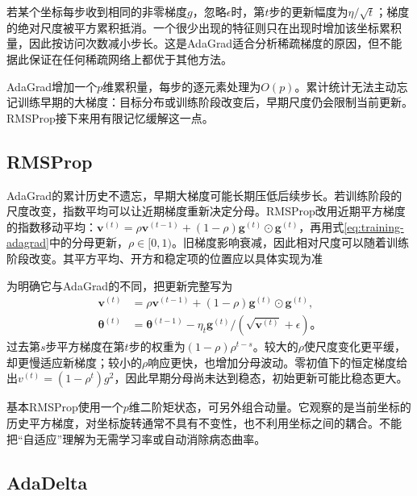 若某个坐标每步收到相同的非零梯度$g$，忽略$\epsilon$时，第$t$步的更新幅度为$\eta/\sqrt t$；梯度的绝对尺度被平方累积抵消。一个很少出现的特征则只在出现时增加该坐标累积量，因此按访问次数减小步长。这是AdaGrad适合分析稀疏梯度的原因，但不能据此保证在任何稀疏网络上都优于其他方法。

AdaGrad增加一个$p$维累积量，每步的逐元素处理为$O(p)$。累计统计无法主动忘记训练早期的大梯度：目标分布或训练阶段改变后，早期尺度仍会限制当前更新。RMSProp接下来用有限记忆缓解这一点。

\subsection{RMSProp}
\label{sec:training-rmsprop}

AdaGrad的累计历史不遗忘，早期大梯度可能长期压低后续步长。若训练阶段的尺度改变，指数平均可以让近期梯度重新决定分母。RMSProp改用近期平方梯度的指数移动平均：$\bm v^{(t)}=\rho\bm v^{(t-1)}+(1-\rho)\bm g^{(t)}\odot\bm g^{(t)}$，再用式\eqref{eq:training-adagrad}中的分母更新，$\rho\in[0,1)$。旧梯度影响衰减，因此相对尺度可以随着训练阶段改变。其平方平均、开方和稳定项的位置应以具体实现为准

为明确它与AdaGrad的不同，把更新完整写为
\begin{equation}
  \begin{aligned}
  \bm v^{(t)}&=\rho\bm v^{(t-1)}+(1-\rho)\bm g^{(t)}\odot\bm g^{(t)},\\
  \bm\theta^{(t)}&=\bm\theta^{(t-1)}-
    \eta_t\bm g^{(t)}/(\sqrt{\bm v^{(t)}}+\epsilon)\text{。}
  \end{aligned}
  \label{eq:training-rmsprop}
\end{equation}
过去第$s$步平方梯度在第$t$步的权重为$(1-\rho)\rho^{t-s}$。较大的$\rho$使尺度变化更平缓，却更慢适应新梯度；较小的$\rho$响应更快，也增加分母波动。零初值下的恒定梯度给出$v^{(t)}=(1-\rho^t)g^2$，因此早期分母尚未达到稳态，初始更新可能比稳态更大。

基本RMSProp使用一个$p$维二阶矩状态，可另外组合动量。它观察的是当前坐标的历史平方梯度，对坐标旋转通常不具有不变性，也不利用坐标之间的耦合。不能把“自适应”理解为无需学习率或自动消除病态曲率。

\subsection{AdaDelta}
\label{sec:training-adadelta}


